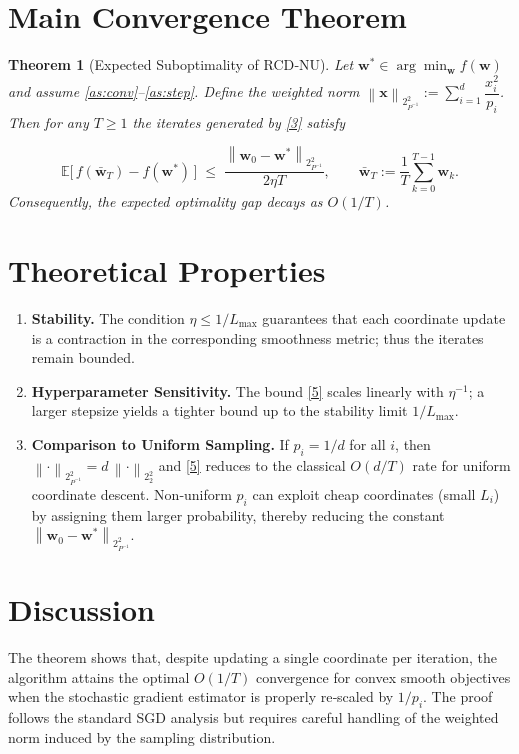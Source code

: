 \documentclass{article}
\newtheorem{theorem}{Theorem}
\newcommand{\E}{\mathbb{E}}
\newcommand{\norm}[2][2]{\left\lVert #2\right\rVert_{#1}}
\begin{document}
\section*{Main Convergence Theorem}
\begin{theorem}[Expected Suboptimality of RCD‑NU]\label{thm:main}
Let $\mathbf{w}^{*}\in\arg\min_{\mathbf{w}}f(\mathbf{w})$ and assume \ref{as:conv}–\ref{as:step}.
Define the weighted norm $\norm{\mathbf{x}}_{P^{-1}}^{2}:=\sum_{i=1}^{d}\dfrac{x_i^{2}}{p_i}$.
Then for any $T\ge1$ the iterates generated by \eqref{3} satisfy  

\[
\E\!\big[\,f(\bar{\mathbf{w}}_{T})-f(\mathbf{w}^{*})\,\big]
\;\le\;
\frac{\norm{\mathbf{w}_{0}-\mathbf{w}^{*}}_{P^{-1}}^{2}}{2\eta T},
\qquad 
\bar{\mathbf{w}}_{T}:=\frac{1}{T}\sum_{k=0}^{T-1}\mathbf{w}_{k}.
\tag{5}
\]
Consequently, the expected optimality gap decays as $O(1/T)$.
\end{theorem}

\section*{Theoretical Properties}
\begin{enumerate}[label=\arabic*.]
\item \textbf{Stability.} The condition $\eta\le 1/L_{\max}$ guarantees that each coordinate update is a contraction in the corresponding smoothness metric; thus the iterates remain bounded.
\item \textbf{Hyperparameter Sensitivity.} The bound \eqref{5} scales linearly with $\eta^{-1}$; a larger stepsize yields a tighter bound up to the stability limit $1/L_{\max}$.
\item \textbf{Comparison to Uniform Sampling.} If $p_i=1/d$ for all $i$, then $\norm{\cdot}_{P^{-1}}^{2}=d\,\norm{\cdot}_{2}^{2}$ and \eqref{5} reduces to the classical $O(d/T)$ rate for uniform coordinate descent. Non‑uniform $p_i$ can exploit cheap coordinates (small $L_i$) by assigning them larger probability, thereby reducing the constant $\norm{\mathbf{w}_{0}-\mathbf{w}^{*}}_{P^{-1}}^{2}$.
\end{enumerate}

\section*{Discussion}
The theorem shows that, despite updating a single coordinate per iteration, the algorithm attains the optimal $O(1/T)$ convergence for convex smooth objectives when the stochastic gradient estimator is properly re‑scaled by $1/p_i$. The proof follows the standard SGD analysis but requires careful handling of the weighted norm induced by the sampling distribution.
\end{document}
